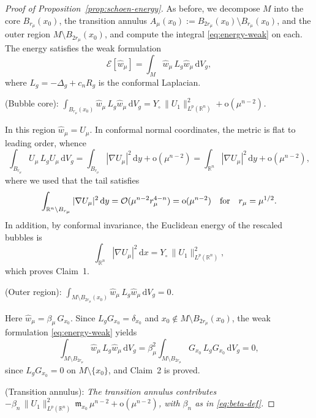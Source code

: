 \documentclass[reqno,11pt]{amsart}
\numberwithin{equation}{section}
\theoremstyle{definition}
\theoremstyle{remark}
\newcommand{\ud}{\,\mathrm{d}}
\newcommand{\R}{\mathbb{R}}
\begin{document}
\begin{proof}[Proof of Proposition~\ref{prop:schoen-energy}]
As before, we decompose $M$ into the core $B_{r_\mu}(x_0)$, the transition annulus $A_\mu(x_0):=B_{2r_\mu}(x_0) \setminus B_{r_\mu}(x_0)$, and the outer region $M \setminus B_{2r_\mu}(x_0)$, and compute the integral \eqref{eq:energy-weak} on each. The energy satisfies the weak formulation
\begin{equation}\label{eq:energy-weak}
\mathcal{E}[\hat{w}_\mu] = \int_M \hat{w}_\mu\, L_g \hat{w}_\mu \ud V_g,
\end{equation}
where $L_g = -\Delta_g + c_n R_g$ is the conformal Laplacian.

\medskip
{} {\rm (Bubble core):} {\it $\int_{B_{r_\mu}(x_0)} \hat{w}_\mu\, L_g \hat{w}_\mu \ud V_g = Y_\circ\,\|U_1\|_{L^p(\R^n)}^2 + \mathrm{o}(\mu^{n-2})$.}

\smallskip
{} In this region $\hat{w}_\mu = U_\mu$. In conformal normal coordinates, the metric is flat to leading order, whence
\[
\int_{B_{r_\mu}} U_\mu\, L_g U_\mu \ud V_g = \int_{B_{r_\mu}} |\nabla U_\mu|^2 \ud y + \mathrm{o}(\mu^{n-2}) = \int_{\R^n} |\nabla U_\mu|^2 \ud y + \mathrm{o}(\mu^{n-2}),
\]
where we used that the tail satisfies
\[
\int_{\R^n \setminus B_{r_\mu}} |\nabla U_\mu|^2 \ud y = \mathcal{O}(\mu^{n-2} r_\mu^{4-n}) = \mathrm{o}(\mu^{n-2})
\quad {\rm for} \quad r_\mu = \mu^{1/2}.\]
In addition, by conformal invariance, the Euclidean energy of the rescaled bubbles is
\[
\int_{\R^n}|\nabla U_\mu|^2 \ud x=Y_\circ\,\|U_1\|_{L^p(\R^n)}^2,
\]
which proves Claim~1.

\medskip
{} {\rm (Outer region):} {\it $\int_{M \setminus B_{2r_\mu}(x_0)} \hat{w}_\mu\, L_g \hat{w}_\mu \ud V_g = 0$.}

\smallskip
{} Here $\hat{w}_\mu = \beta_\mu\, G_{x_0}$. Since $L_g G_{x_0} = \delta_{x_0}$ and $x_0 \notin M \setminus B_{2r_\mu}(x_0)$, the weak formulation \eqref{eq:energy-weak} yields
\[
\int_{M \setminus B_{2r_\mu}} \hat{w}_\mu\, L_g \hat{w}_\mu \ud V_g = \beta_\mu^2 \int_{M \setminus B_{2r_\mu}} G_{x_0}\, L_g G_{x_0} \ud V_g = 0,
\]
since $L_g G_{x_0} = 0$ on $M \setminus \{x_0\}$, and Claim~2 is proved.

\medskip
{} {\rm (Transition annulus):} {\it The transition annulus contributes $-\beta_n\, \|U_1\|_{L^p(\R^n)}^2\, \mathfrak{m}_{x_0}\, \mu^{n-2} + \mathrm{o}(\mu^{n-2})$, with $\beta_n$ as in \eqref{eq:beta-def}.}


\end{proof}
\end{document}
